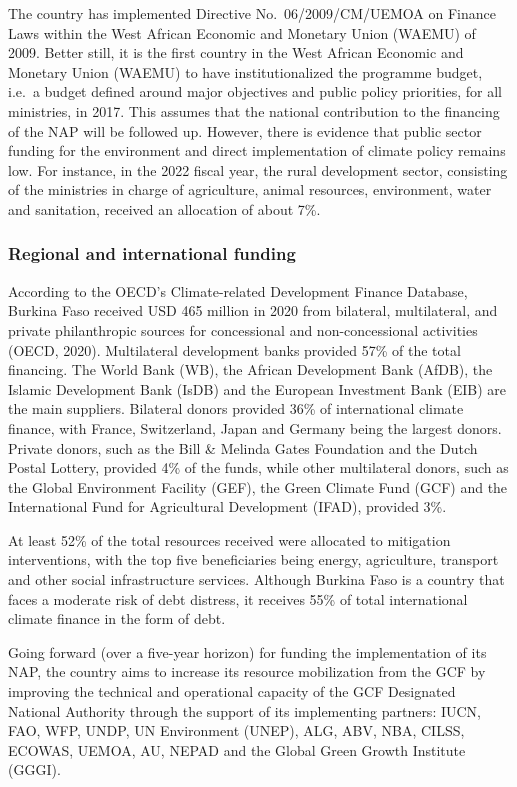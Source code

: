 \documentclass[
]{book}
\begin{document}
The country has implemented Directive No.~06/2009/CM/UEMOA on Finance Laws within the West African Economic and Monetary Union (WAEMU) of 2009. Better still, it is the first country in the West African Economic and Monetary Union (WAEMU) to have institutionalized the programme budget, i.e.~a budget defined around major objectives and public policy priorities, for all ministries, in 2017. This assumes that the national contribution to the financing of the NAP will be followed up. However, there is evidence that public sector funding for the environment and direct implementation of climate policy remains low. For instance, in the 2022 fiscal year, the rural development sector, consisting of the ministries in charge of agriculture, animal resources, environment, water and sanitation, received an allocation of about 7\%.

\subsubsection{Regional and international funding}\label{regional-and-international-funding}

According to the OECD's Climate-related Development Finance Database, Burkina Faso received USD 465 million in 2020 from bilateral, multilateral, and private philanthropic sources for concessional and non-concessional activities (OECD, 2020). Multilateral development banks provided 57\% of the total financing. The World Bank (WB), the African Development Bank (AfDB), the Islamic Development Bank (IsDB) and the European Investment Bank (EIB) are the main suppliers. Bilateral donors provided 36\% of international climate finance, with France, Switzerland, Japan and Germany being the largest donors. Private donors, such as the Bill \& Melinda Gates Foundation and the Dutch Postal Lottery, provided 4\% of the funds, while other multilateral donors, such as the Global Environment Facility (GEF), the Green Climate Fund (GCF) and the International Fund for Agricultural Development (IFAD), provided 3\%.

At least 52\% of the total resources received were allocated to mitigation interventions, with the top five beneficiaries being energy, agriculture, transport and other social infrastructure services. Although Burkina Faso is a country that faces a moderate risk of debt distress, it receives 55\% of total international climate finance in the form of debt.

Going forward (over a five-year horizon) for funding the implementation of its NAP, the country aims to increase its resource mobilization from the GCF by improving the technical and operational capacity of the GCF Designated National Authority through the support of its implementing partners: IUCN, FAO, WFP, UNDP, UN Environment (UNEP), ALG, ABV, NBA, CILSS, ECOWAS, UEMOA, AU, NEPAD and the Global Green Growth Institute (GGGI).
\end{document}
